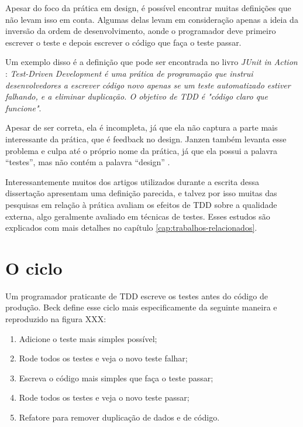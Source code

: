 Apesar do foco da prática em design, é possível encontrar muitas definições que
não levam isso em conta. Algumas delas levam em consideração apenas a ideia da
inversão da ordem de desenvolvimento, aonde o programador deve primeiro escrever
o teste e depois escrever o código que faça o teste passar.

Um exemplo disso é a definição que pode ser encontrada no livro \textit{JUnit
in Action} \cite{junit-in-action}: \textit{Test-Driven Development é uma
prática de programação que instrui desenvolvedores a escrever código novo
apenas se um teste automatizado estiver falhando, e a eliminar duplicação. O
objetivo de TDD é "código claro que funcione"}.

Apesar de ser correta, ela é incompleta, já que ela não captura a parte mais
interessante da prática, que é feedback no design. Janzen também levanta esse
problema e culpa até o próprio nome da prática, já que ela possui a palavra
``testes'', mas não contém a palavra ``design'' \cite{tdd-really-improve}.

Interessantemente muitos dos artigos utilizados durante a escrita dessa
dissertação apresentam uma definição parecida, e talvez por isso muitas das 
pesquisas em relação à prática avaliam os efeitos de TDD sobre a qualidade 
externa, algo geralmente avaliado em técnicas de testes. Esses estudos são 
explicados com mais detalhes no capítulo \ref{cap:trabalhos-relacionados}.

\section{O ciclo}

Um programador praticante de TDD escreve os testes antes do código de produção.
Beck define esse ciclo mais especificamente da seguinte maneira
\cite{TDDByExample} e reproduzido na figura XXX:

\begin{enumerate}
	\item Adicione o teste mais simples possível; 
	\item Rode todos os testes e veja o novo teste falhar; 
	\item Escreva o código mais simples que faça o teste passar; 
	\item Rode todos os testes e veja o novo teste passar; 
	\item Refatore para remover duplicação de dados e de código.
\end{enumerate}

